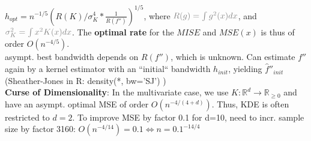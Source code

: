 $h_{opt} = n^{-1/5}\left(R(K)/\sigma_{K}^{4}*\frac{1}{R(f'')}\right)^{1/5}$, where $\mathcolor{gray}{R(g)=\int{g^2(x)dx}}$, and\\ $\mathcolor{gray}{\sigma_{K}^{2}=\int{x^2K(x)dx}}$. The \textbf{optimal rate} for the $MISE$ and $MSE(x)$ is thus of order $O(n^{-4/5})$.\\
\textrightarrow asympt. best bandwidth depends on $R(f'')$, which is unknown. Can estimate $f''$ again by a kernel estimator with an ``initial``  bandwidth $h_{init}$, yielding $\hat{f}''_{init}$ (Sheather-Jones in R: density(*, bw='SJ') )\\
\textbf{Curse of Dimensionality}: In the multivariate case, we use $K: \mathbb{R}^d \to \mathbb{R}_{\geq0}$ and have an asympt. optimal MSE of order $O\left(n^{-4/(4+d)} \right)$. Thus, KDE is often restricted to $d=2$. To improve MSE by factor 0.1 for d=10, need to incr. sample size by factor 3160: $O(n^{-4/14}) = 0.1 \iff n = 0.1^{-14/4}$



